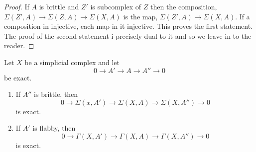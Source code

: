 \begin{proof}
If $A$ is brittle and $Z'$ is subcomplex of $Z$ then the composition, $\Sigma(Z', A)\rightarrow \Sigma(Z, A) \rightarrow \Sigma(X, A)$ is the map, $\Sigma(Z', A) \rightarrow \Sigma(X, A)$. If a composition in injective, each map in it injective. This proves the first statement. The proof of the second statement i precisely dual to it and so we leave in to the reader.
\end{proof}

\begin{secthm}\label{chap6-thm-6.5}
Let $X$ be a simplicial complex and let
$$
0 \rightarrow A' \rightarrow A \rightarrow A'' \rightarrow 0
$$
be exact.
\begin{enumerate}[(1)]
    \item If $A''$ is brittle, then
    $$
    0 \rightarrow \Sigma(x, A') \rightarrow \Sigma(X, A)\rightarrow\Sigma(X, A'') \rightarrow 0
    $$
    is exact.\label{chap6-thm6.5-enmu-1}
    
    \item If $A'$ is flabby, then
    $$
    0\rightarrow \Gamma(X, A') \rightarrow \Gamma (X,A)\rightarrow \Gamma(X, A'')\rightarrow 0
    $$
    is exact.\label{chap6-thm6.5-enum-2}
\end{enumerate}
\end{secthm}

